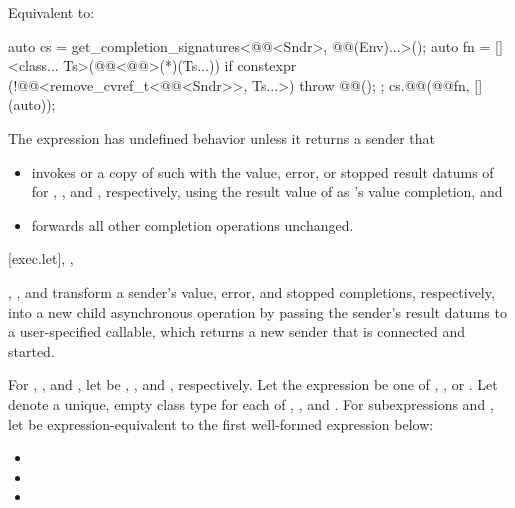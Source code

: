 \begin{itemdescr}
\pnum
\effects
Equivalent to:
\begin{codeblock}
auto cs = get_completion_signatures<@@<Sndr>, @@(Env)...>();
auto fn = []<class... Ts>(@@<@@>(*)(Ts...)) {
  if constexpr (!@@<remove_cvref_t<@@<Sndr>>, Ts...>)
    throw @@();
};
cs.@@(@@{fn, [](auto){}});
\end{codeblock}
\end{itemdescr}

\pnum
The expression  has undefined behavior
unless it returns a sender  that
\begin{itemize}
\item
invokes  or a copy of such
with the value, error, or stopped result datums of 
for , , and , respectively,
using the result value of  as 's value completion, and
\item
forwards all other completion operations unchanged.
\end{itemize}

[exec.let]{, , }

\pnum
{}, , and  transform
a sender's value, error, and stopped completions, respectively,
into a new child asynchronous operation
by passing the sender's result datums to a user-specified callable,
which returns a new sender that is connected and started.

\pnum
For , , and ,
let  be
, , and , respectively.
Let the expression  be one of
, , or .
Let  denote a unique, empty class type for each of
, , and .
For subexpressions  and ,
let  be expression-equivalent to
the first well-formed expression below:
\begin{itemize}
\item
{}
\item
{}
\item
{}
\end{itemize}

